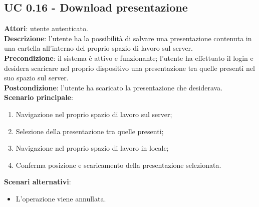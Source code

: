 \subsection{UC 0.16 - Download presentazione}{
	\label{uc0.16}
	\textbf{Attori}: utente autenticato.	\\
	\textbf{Descrizione}: l'utente ha la possibilità di salvare una presentazione contenuta in una cartella all'interno del proprio spazio di lavoro sul server. \\
	\textbf{Precondizione}: il sistema è attivo e funzionante; l'utente ha effettuato il login e desidera scaricare nel proprio dispositivo una presentazione tra quelle presenti nel suo spazio sul server.	\\
	\textbf{Postcondizione}: l'utente ha scaricato la presentazione che desiderava.	\\
	\textbf{Scenario principale}:
	\begin{enumerate}
		\item Navigazione nel proprio spazio di lavoro sul server;
		\item Selezione della presentazione tra quelle presenti;
		\item Navigazione nel proprio spazio di lavoro in locale;
		\item Conferma posizione e scaricamento della presentazione selezionata.
	\end{enumerate}
	\textbf{Scenari alternativi}: 
	\begin{itemize}
		\item L'operazione viene annullata.
	\end{itemize}
	}